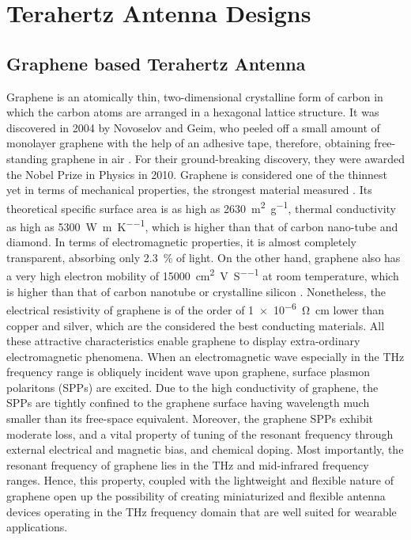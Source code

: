 \documentclass[12pt]{suhbook}
\begin{document}
\section{Terahertz Antenna Designs}
% 
\subsection{Graphene based Terahertz Antenna}
% 
Graphene is an atomically thin, two-dimensional crystalline form of carbon in which the carbon atoms are arranged in a hexagonal lattice structure. It was discovered in 2004 by Novoselov and Geim, who peeled off a small amount of monolayer graphene with the help of an adhesive tape, therefore, obtaining free-standing graphene in air \cite{novoselov2004electric}. For their ground-breaking discovery, they were awarded the Nobel Prize in Physics in 2010. Graphene is considered one of the thinnest yet in terms of mechanical properties, the strongest material measured  \cite{campos2008bulk,lee2013high}. Its theoretical specific surface area is as high as \SI{2630}{\square\m\per\gram}, thermal conductivity as high as \SI{5300}{\W \per \m \per \K}, which is higher than that of carbon nano-tube and diamond. In terms of electromagnetic properties, it is almost completely transparent, absorbing only \SI{2.3}{\percent} of light. On the other hand, graphene also has a very high electron mobility of \SI{15000}{\square \cm \per\V \per \siemens} at room temperature, which is higher than that of carbon nanotube or crystalline silicon \cite{ju2011graphene}. Nonetheless, the electrical resistivity of graphene is of the order of \SI{1e-6}{\ohm \cm} lower than copper and silver, which are the considered the best conducting materials. All these attractive characteristics enable graphene to display extra-ordinary electromagnetic phenomena. When an electromagnetic wave especially in the THz frequency range is obliquely incident wave upon graphene, surface plasmon polaritons (SPPs) are excited. Due to the high conductivity of graphene, the SPPs are tightly confined to the graphene surface having wavelength much smaller than its free-space equivalent. Moreover, the graphene SPPs exhibit moderate loss, and a vital property of tuning of the resonant frequency through external electrical and magnetic bias, and chemical doping. Most importantly, the resonant frequency of graphene lies in the THz and mid-infrared frequency ranges. Hence, this property, coupled with the lightweight and flexible nature of graphene open up the possibility of creating miniaturized and flexible antenna devices operating in the THz frequency domain that are well suited for wearable applications.
\end{document}
